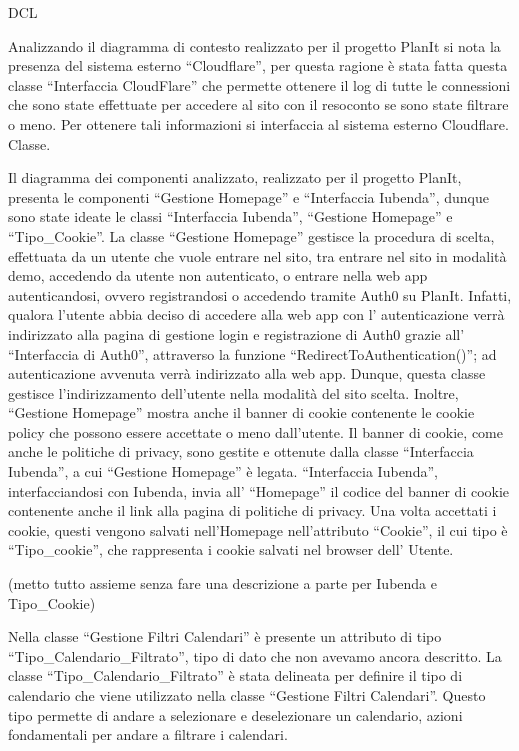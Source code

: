 \begin{listaPersonale}{DCL}

    Analizzando il diagramma di contesto realizzato per il progetto PlanIt si nota la presenza del sistema esterno “Cloudflare”, per questa ragione è stata fatta questa classe “Interfaccia CloudFlare” che permette ottenere il log di tutte le connessioni che sono state effettuate per accedere al sito con il resoconto se sono state filtrare o meno. Per ottenere tali informazioni si interfaccia al sistema esterno Cloudflare. Classe.



    Il diagramma dei componenti analizzato, realizzato per il progetto PlanIt, presenta le componenti “Gestione Homepage” e “Interfaccia Iubenda”, dunque sono state ideate le classi “Interfaccia Iubenda”, “Gestione Homepage” e “Tipo\_Cookie”.
    La classe “Gestione Homepage” gestisce la procedura di scelta, effettuata da un utente che vuole entrare nel sito, tra entrare nel sito in modalità demo, accedendo da utente non autenticato, o entrare nella web app autenticandosi, ovvero registrandosi o accedendo tramite Auth0 su PlanIt. Infatti, qualora l'utente abbia deciso di accedere alla web app con l' autenticazione verrà indirizzato alla pagina di gestione login e registrazione di Auth0 grazie all' “Interfaccia di Auth0”, attraverso la funzione “RedirectToAuthentication()”; ad autenticazione avvenuta verrà indirizzato alla web app. Dunque, questa classe gestisce l'indirizzamento dell'utente nella modalità del sito scelta. Inoltre, “Gestione Homepage” mostra anche il banner di cookie contenente le cookie policy che possono essere accettate o meno dall'utente. Il banner di cookie, come anche le politiche di privacy, sono gestite e ottenute dalla classe “Interfaccia Iubenda”, a cui “Gestione Homepage” è legata. “Interfaccia Iubenda”, interfacciandosi con Iubenda, invia all' “Homepage” il codice del banner di cookie contenente anche il link alla pagina di politiche di privacy. Una volta accettati i cookie, questi vengono salvati nell'Homepage nell'attributo “Cookie”, il cui tipo è “Tipo\_cookie”, che rappresenta i cookie salvati nel browser dell' Utente.

    (metto tutto assieme senza fare una descrizione a parte per Iubenda e Tipo\_Cookie)


    Nella classe “Gestione Filtri Calendari” è presente un attributo di tipo “Tipo\_Calendario\_Filtrato”, tipo di dato che non avevamo ancora descritto. La classe “Tipo\_Calendario\_Filtrato” è stata delineata per definire il tipo di calendario che viene utilizzato nella classe “Gestione Filtri Calendari”. Questo tipo permette di andare a selezionare e deselezionare un calendario, azioni fondamentali per andare a filtrare i calendari.




\end{listaPersonale}
